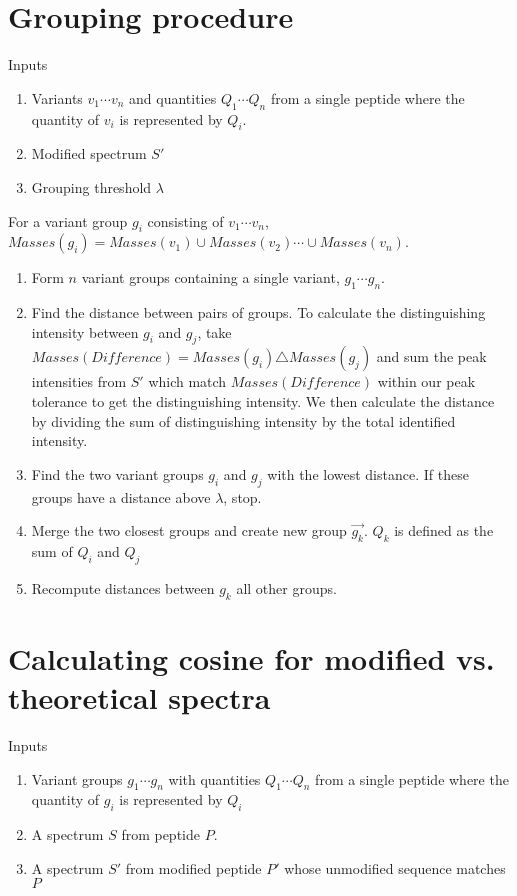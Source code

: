 \documentclass[11pt]{article}
\begin{document}
\section{Grouping procedure}

Inputs
\begin{enumerate}
\item Variants $v_1 \cdots v_n$ and quantities $Q_1 \cdots Q_n$ from a single peptide where the quantity of $v_i$ is represented by $Q_i$. 
\item Modified spectrum $S'$
\item Grouping threshold $\lambda$
\end{enumerate} 

For a variant group $g_i$ consisting of $v_1 \cdots v_n$, $Masses(g_i)=Masses(v_1) \cup Masses(v_2) \cdots \cup Masses(v_n)$.

\begin{enumerate}
\item Form $n$ variant groups containing a single variant, $g_{1} \cdots g_{n}$.
\item Find the distance between pairs of groups. To calculate the distinguishing intensity between $g_{i}$ and $g_{j}$, take $Masses(Difference)=Masses(g_i) \triangle Masses(g_j)$ and sum the peak intensities from $S'$ which match $Masses(Difference)$ within our peak tolerance to get the distinguishing intensity. We then calculate the distance by dividing the sum of distinguishing intensity by the total identified intensity.
\item Find the two variant groups $g_{i}$ and $g_{j}$ with the lowest distance. If these groups have a distance above $\lambda$, stop.
\item Merge the two closest groups and create new group $\vec{g_{k}}$. $Q_k$ is defined as the sum of $Q_i$ and $Q_j$
\item Recompute distances between $g_{k}$ all other groups.
\end{enumerate}

\section{Calculating cosine for modified vs. theoretical spectra}
Inputs
\begin{enumerate}
\item Variant groups $g_1 \cdots g_n$ with quantities $Q_1 \cdots Q_n$ from a single peptide where the quantity of $g_i$ is represented by $Q_i$
\item A spectrum $S$ from peptide $P$.
\item A spectrum $S'$ from modified peptide $P'$ whose unmodified sequence matches $P$
\end{enumerate}
\end{document}
